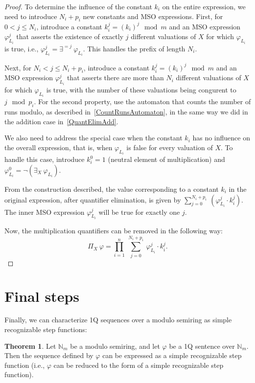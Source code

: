 \documentclass[en]{pracamgr}
\theoremstyle{definition}
\newtheorem{theorem}{Theorem}[section]
\begin{document}
\begin{proof}
    To determine the influence of the constant $k_i$ on the entire expression, we need to introduce $N_i + p_i$ new constants and MSO expressions. First, for $0 < j \leq N_i$, introduce a constant $k_i^j = (k_i)^j \mod m$ and an MSO expression $\varphi_{L_i}^j$ that asserts the existence of exactly $j$ different valuations of $X$ for which $\varphi_{L_i}$ is true, i.e., $\varphi_{L_i}^j = \exists^{=j} \ \varphi_{L_i}$. This handles the prefix of length $N_i$.
    
    Next, for $N_i < j \leq N_i + p_i$, introduce a constant $k_i^j = (k_i)^j \mod m$ and an MSO expression $\varphi_{L_i}^j$ that asserts there are more than $N_i$ different valuations of $X$ for which $\varphi_{L_i}$ is true, with the number of these valuations being congurent to $j \mod p_i$. For the second property, use the automaton that counts the number of runs modulo, as described in~\cref{CountRunsAutomaton}, in the same way we did in the addition case in~\cref{QuantElimAdd}.

    We also need to address the special case when the constant $k_i$ has no influence on the overall expression, that is, when $\varphi_{L_i}$ is false for every valuation of $X$. To handle this case, introduce $k_i^0 = 1$ (neutral element of multiplication) and $\varphi_{L_i}^0 = \neg(\exists_X \ \varphi_{L_i})$.

    From the construction described, the value corresponding to a constant $k_i$ in the original expression, after quantifier elimination, is given by $\sum_{j = 0}^{N_i + p_i} \ (\varphi_{L_i}^j \cdot k_i^j)$. The inner MSO expression $\varphi_{L_i}^j$ will be true for exactly one $j$.
    
    Now, the multiplication quantifiers can be removed in the following way:
    $$\Pi_X \ \varphi = \prod_{i = 1}^n \ \sum_{j = 0}^{N_i + p_i} \ \varphi_{L_i}^j \cdot k_i^j.$$
\end{proof}

\section{Final steps}
Finally, we can characterize 1Q sequences over a modulo semiring as simple recognizable step functions:

\begin{theorem}
    \label{OverModAreSimpleRec}
    Let $\mathbb{N}_m$ be a modulo semiring, and let $\varphi$ be a 1Q sentence over $\mathbb{N}_m$. Then the sequence defined by $\varphi$ can be expressed as a simple recognizable step function (i.e., $\varphi$ can be reduced to the form of a simple recognizable step function). 
\end{theorem}
\end{document}
